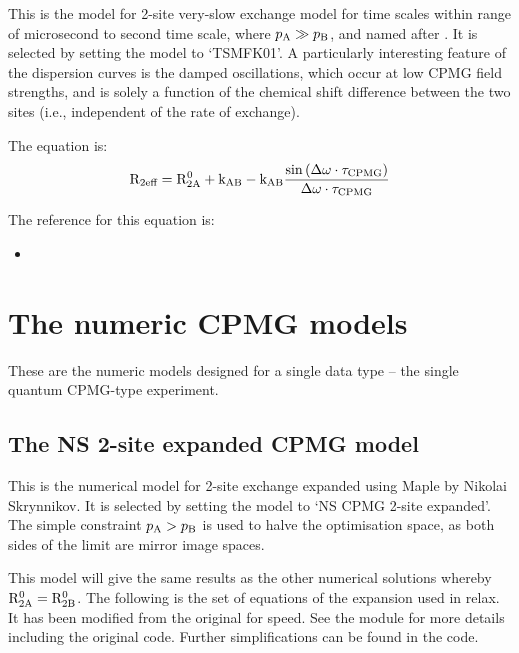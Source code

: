 This is the model for 2-site very-slow exchange model for time scales within range of microsecond to second time scale, where $p_\textrm{A} \gg p_\textrm{B}$, and named after \citet{Tollinger01}.  It is selected by setting the model to `TSMFK01'.  A particularly interesting feature of the dispersion curves is the damped oscillations, which occur at low CPMG field strengths, and is solely a function of the chemical shift difference between the two sites (i.e., independent of the rate of exchange).  

The equation is:
\begin{align}
    \mathrm{R}_\textrm{2eff} = \mathrm{R}_\mathrm{2A}^0 + \textrm{k}_\textrm{AB} - \textrm{k}_\textrm{AB} \frac{\sin{(\Delta\omega\cdot \tau_\textrm{CPMG})}}{\Delta\omega \cdot \tau_\textrm{CPMG}}
\end{align}

The reference for this equation is:
\begin{itemize}
\item {}
\end{itemize}




\section{The numeric CPMG models}
\label{sect: dispersion: numeric CPMG models}

These are the numeric models designed for a single data type -- the single quantum CPMG-type experiment.



\subsection{The NS 2-site expanded CPMG model}
\label{sect: dispersion: NS CPMG 2-site expanded model}

This is the numerical model for 2-site exchange expanded using Maple by Nikolai Skrynnikov.
It is selected by setting the model to `NS CPMG 2-site expanded'.
The simple constraint $p_\textrm{A} > p_\textrm{B}$ is used to halve the optimisation space, as both sides of the limit are mirror image spaces.

This model will give the same results as the other numerical solutions whereby $\mathrm{R}_\mathrm{2A}^0 = \mathrm{R}_\mathrm{2B}^0$.  The following is the set of equations of the expansion used in relax.  It has been modified from the original for speed.  See the  module for more details including the original code.  Further simplifications can be found in the code.


